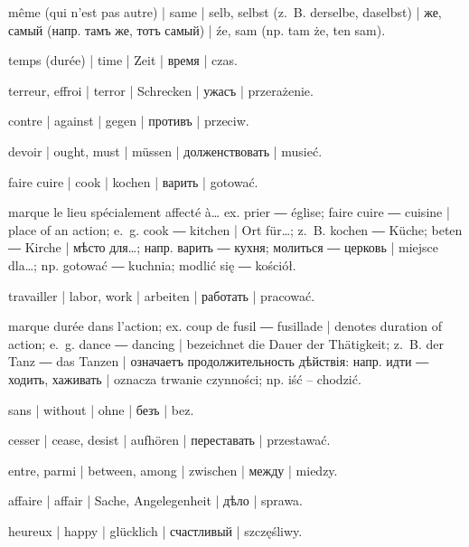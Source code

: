 \begin{ekzvocab}{1em}
 même (qui n’est pas autre) | same | selb, selbst (z.~B. derselbe, daselbst) | же, самый (напр. тамъ же, тотъ самый) | źe, sam (np. tam że, ten sam).

 temps (durée) | time | Zeit | время | czas.

 terreur, effroi | terror | Schrecken | ужасъ | przerażenie.

 contre | against | gegen | противъ | przeciw.

 devoir | ought, must | müssen | долженствовать | musieć.

 faire cuire | cook | kochen | варить | gotować.

 marque le lieu spécialement affecté à\ldots{} ex.  prier ―  église;  faire cuire ―  cuisine | place of an action; e.~g.  cook ―  kitchen | Ort für\ldots{}; z.~B.  kochen ―  Küche;  beten ―  Kirche | мѣсто для\ldots{}; напр.  варить ―  кухня;  молиться ―  церковь | miejsce dla\ldots{}; np.  gotować ―  kuchnia;  modlić się ―  kościół.

 travailler | labor, work | arbeiten | работать | pracować.

 marque durée dans l’action; ex.  coup de fusil ―  fusillade | denotes duration of action; e.~g.  dance ―  dancing | bezeichnet die Dauer der Thätigkeit; z.~B.  der Tanz ―  das Tanzen | означаетъ продолжительность дѣйствія: напр.  идти ―  ходить, хаживать | oznacza trwanie czynności; np.  iść --  chodzić.

 sans | without | ohne | безъ | bez.

 cesser | cease, desist | aufhören | переставать | przestawać.

 entre, parmi | between, among | zwischen | между | miedzy.

 affaire | affair | Sache, Angelegenheit | дѣло | sprawa.

 heureux | happy | glücklich | счастливый | szczęśliwy.


\end{ekzvocab}
